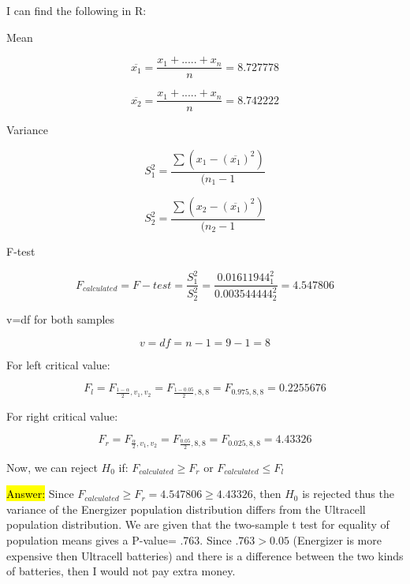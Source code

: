 \documentclass{article}
\begin{document}
\vspace{3mm}

I can find the following in R:

\vspace{3mm}

Mean

$$\overline{x_{1}}=\frac{x_{1}+.....+x_{n}}{n}=8.727778$$



$$\overline{x_{2}}=\frac{x_{1}+.....+x_{n}}{n}=8.742222$$

\vspace{3mm}

Variance

$$S_{1}^{2}=\frac{\sum(x_{1}-(\overline{x_{1}})^{2})}{(n_{1}-1}$$

$$S_{2}^{2}=\frac{\sum(x_{2}-(\overline{x_{1}})^{2})}{(n_{2}-1}$$

\vspace{3mm}

F-test

$$F_{calculated}=F-test=\frac{S^{2}_{1}}{S_{2}^{2}}=\frac{0.01611944^{2}_{1}}{ 0.003544444_{2}^{2}}=4.547806$$

\vspace{3mm}

v=df for both samples

$$v=df=n-1=9-1=8$$ 

For left critical value:

$$F_{l}=F_{\frac{1-\alpha}{2}, v_{1}, v_{2}}=F_{\frac{1-0.05}{2}, 8, 8}=F_{0.975, 8, 8}=0.2255676$$

\vspace{3mm}

For right critical value:

$$F_{r}=F_{\frac{\alpha}{2}, v_{1}, v_{2}}=F_{\frac{0.05}{2}, 8, 8}=F_{0.025,8,8}=4.43326$$

Now, we can reject $H_{0}$ if: $F_{calculated} \ge F_{r}$ or $F_{calculated} \le F_{l}$

\vspace{3mm}



\vspace{3mm}



\hl{Answer:} Since $F_{calculated} \ge F_{r}= 4.547806 \ge 4.43326$, then $H_{0}$ is rejected thus the variance of the Energizer population distribution differs from the Ultracell population distribution. We are given that the two-sample t test for equality of population means gives a P-value= .763. Since $.763 > 0.05$ (Energizer is more expensive then Ultracell batteries) and there is a difference between the two kinds of batteries, then I would not pay extra money. 
\end{document}
